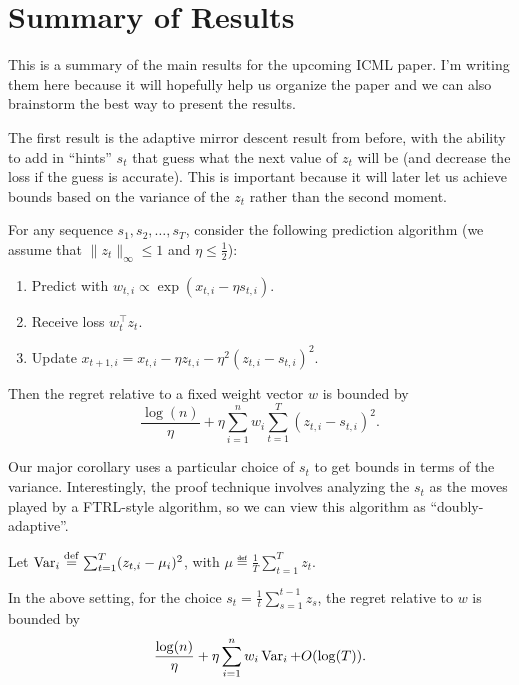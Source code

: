 \documentclass[11pt]{article}
\begin{document}
\section{Summary of Results}
This is a summary of the main results for the upcoming ICML paper. I'm writing them here because it 
will hopefully help us organize the paper and we can also brainstorm the best way to present the results.

The first result is the adaptive mirror descent result from before, with the ability to add in 
``hints'' $s_t$ that guess what the next value of $z_t$ will be (and decrease the loss if the guess is 
accurate). This is important because it will later let us achieve bounds based on the variance of the $z_t$ 
rather than the second moment.
\begin{theorem}
For any sequence $s_1, s_2, \ldots, s_T$, consider the following prediction algorithm (we assume 
that $\|z_t\|_{\infty} \leq 1$ and $\eta \leq \frac{1}{2}$):
\begin{enumerate}
\item Predict with $w_{t,i} \propto \exp(x_{t,i} - \eta s_{t,i})$.
\item Receive loss $w_t^{\top}z_t$.
\item Update $x_{t+1,i} = x_{t,i} - \eta z_{t,i} - \eta^2 (z_{t,i} - s_{t,i})^2$.
\end{enumerate}
Then the regret relative to a fixed weight vector $w$ is bounded by
\[ \frac{\log(n)}{\eta} + \eta \sum_{i=1}^n w_i \sum_{t=1}^T (z_{t,i}-s_{t,i})^2. \]
\end{theorem}

Our major corollary uses a particular choice of $s_t$ to get bounds in terms of the variance. Interestingly, 
the proof technique involves analyzing the $s_t$ as the moves played by a FTRL-style algorithm, so we can 
view this algorithm as ``doubly-adaptive''.

Let $\operatorname{Var}_i \stackrel{\mathrm{def}}{=} \sum_{t=1}^T (z_{t,i}-\mu_i)^2$, with $\mu \eqdef \frac{1}{T} \sum_{t=1}^T z_t$.
\begin{corollary}
In the above setting, for the choice $s_t = \frac{1}{t} \sum_{s=1}^{t-1} z_s$, the 
regret relative to $w$ is bounded by
\[ \frac{\log(n)}{\eta} + \eta \sum_{i=1}^n w_i\operatorname{Var}_i + O(\log(T)). \]
\end{corollary}
\end{document}
